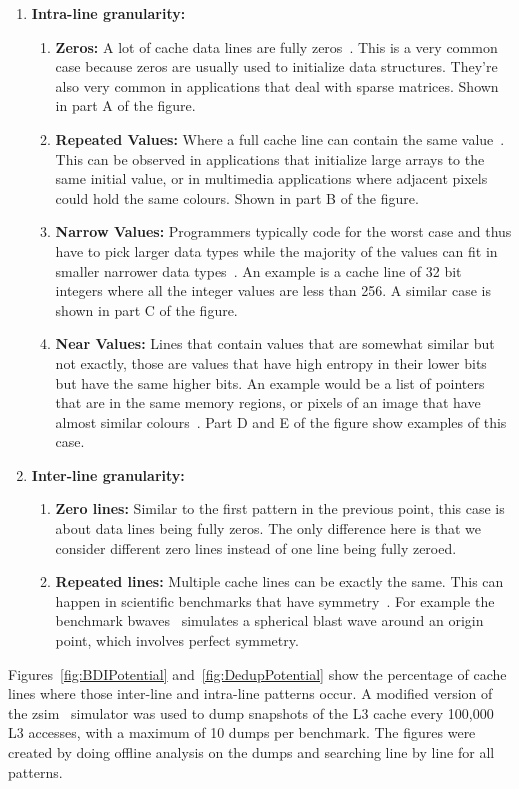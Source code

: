 \begin{enumerate}
    \item \textbf{Intra-line granularity:}
    \begin{enumerate}
        \item \textbf{Zeros:} A lot of cache data lines are fully zeros~\cite{balakrishnan2003exploiting, ekman2005robust, yang2000frequent}. This is a very common case because zeros are usually used to initialize data structures. They're also very common in applications that deal with sparse matrices. Shown in part A of the figure.
        \item \textbf{Repeated Values:} Where a full cache line can contain the same value~\cite{sazeides1997predictability, alameldeen2004adaptive}. This can be observed in applications that initialize large arrays to the same initial value, or in multimedia applications where adjacent pixels could hold the same colours. Shown in part B of the figure.
        \item \textbf{Narrow Values:} Programmers typically code for the worst case and thus have to pick larger data types while the majority of the values can fit in smaller narrower data types~\cite{alameldeen2004adaptive, islam2010characterization, wilson1999case}. An example is a cache line of 32 bit integers where all the integer values are less than 256. A similar case is shown in part C of the figure.
        \item \textbf{Near Values:} Lines that contain values that are somewhat similar but not exactly, those are values that have high entropy in their lower bits but have the same higher bits. An example would be a list of pointers that are in the same memory regions, or pixels of an image that have almost similar colours~\cite{wilson1999case, sun2008dhtc}. Part D and E of the figure show examples of this case.
    \end{enumerate}
    \item \textbf{Inter-line granularity:}
    \begin{enumerate}
        \item \textbf{Zero lines:} Similar to the first pattern in the previous point, this case is about data lines being fully zeros. The only difference here is that we consider different zero lines instead of one line being fully zeroed.
        \item \textbf{Repeated lines:} Multiple cache lines can be exactly the same. This can happen in scientific benchmarks that have symmetry~\cite{dedup}. For example the benchmark bwaves~\cite{spec} simulates a spherical blast wave around an origin point, which involves perfect symmetry.
    \end{enumerate}
\end{enumerate}
Figures~\ref{fig:BDIPotential} and~\ref{fig:DedupPotential} show the percentage of cache lines where those inter-line and intra-line patterns occur. A modified version of the zsim~\cite{zsim} simulator was used to dump snapshots of the L3 cache every 100,000 L3 accesses, with a maximum of 10 dumps per benchmark. The figures were created by doing offline analysis on the dumps and searching line by line for all patterns.

